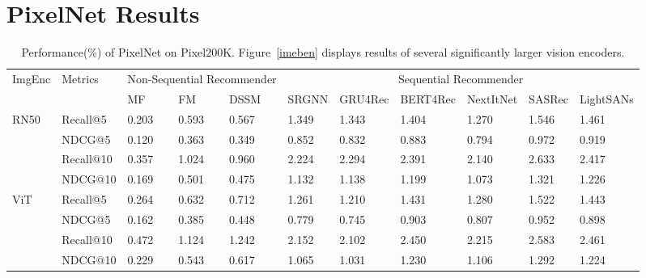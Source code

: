 \documentclass[sigconf]{acmart}
\begin{document}
\section{PixelNet Results}


\begin{table*}[t]
	 	\centering
	 	\caption{Performance(\%) of PixelNet on Pixel200K. Figure~\ref{imeben} displays results of several significantly larger vision encoders.}
	 	\label{tab:compare}
\begin{tabular}{p{1.3cm}<{\centering} p{1.3cm}<{\centering} p{1.1cm}<{\centering} p{1.1cm}<{\centering} p{1.1cm}<{\centering} p{1.2cm}<{\centering} p{1.2cm}<{\centering} p{1.2cm}<{\centering} p{1.2cm}<{\centering} p{1.2cm}<{\centering} p{1.2cm}<{\centering} }
		 		\toprule
		 \multirow{2}{*}{ImgEnc} &\multirow{2}{*}{Metrics} & \multicolumn{3}{c}{Non-Sequential Recommender} & \multicolumn{6}{c}{Sequential Recommender}  \\
		 		\cmidrule(r){3-5} \cmidrule(r){6-11}
		 		& &   MF &  FM & DSSM & SRGNN & GRU4Rec & BERT4Rec & NextItNet & SASRec & LightSANs \\
		 		\midrule
		 		\multirow{4}{*}{RN50} 
		 		& Recall@5  & 0.203   & 0.593   & 0.567   & 1.349 & 1.343   & 1.404   & 1.270   & 1.546   & 1.461 \\
		 		& NDCG@5 & 0.120   & 0.363   & 0.349   & 0.852 & 0.832   & 0.883   & 0.794   & 0.972   & 0.919 \\
		 		& Recall@10  & 0.357   & 1.024   & 0.960   & 2.224 & 2.294   & 2.391   & 2.140   & 2.633   & 2.417 \\
		 		& NDCG@10  & 0.169   & 0.501   & 0.475   & 1.132 & 1.138   & 1.199   & 1.073   & 1.321   & 1.226 \\
		 		\midrule
		 		\multirow{4}{*}{ViT}
		 		&  Recall@5  & 0.264   & 0.632   & 0.712   & 1.261 & 1.210   & 1.431   & 1.280   & 1.522   & 1.443 \\
		 		&  NDCG@5  & 0.162   & 0.385   & 0.448   & 0.779 & 0.745   & 0.903   & 0.807   & 0.952   & 0.898 \\
		 		&  Recall@10  & 0.472   & 1.124   & 1.242   & 2.152 & 2.102   & 2.450   & 2.215   & 2.583   & 2.461 \\
		 		& NDCG@10 & 0.229   & 0.543   & 0.617   & 1.065 & 1.031   & 1.230   & 1.106   & 1.292 & 1.224 \\
\bottomrule
\end{tabular}
\end{table*} 
\end{document}
